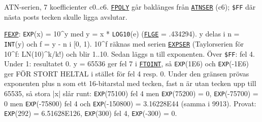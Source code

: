 \begin{Listing}
\Gap
\begin{Cmt}\par\noindent ATN-serien, 7 koefficienter c0..c6. \hyperlink{l:FPOLY}{\texttt{FPOLY}} går baklänges från \hyperlink{l:ATNSER}{\texttt{ATNSER}} (c6); \texttt{\$FF} där nästa posts tecken skulle ligga avslutar.\par\end{Cmt}
\Gap
\begin{Cmt}\par\noindent \hyperlink{l:FEXP}{\texttt{FEXP}}: \texttt{EXP}(x) = 10\^{}y med y = x * \texttt{LOG10}(e) (\hyperlink{l:FLGE}{\texttt{FLGE}} = .434294). y delas i n = \texttt{INT}(y) och f = y - n i [0, 1). 10\^{}f räknas med serien \hyperlink{l:EXPSER}{\texttt{EXPSER}} (Taylorserien för 10\^{}f: LN(10)\^{}k/k!) och blir 1..10. Sedan läggs n till exponenten. Över \texttt{\$FF}: fel 4. Under 1: resultatet 0. {}y{} {}= 65536 ger fel 7 i \hyperlink{l:FTOINT}{\texttt{FTOINT}}, så \texttt{EXP}(1E6) och \texttt{EXP}(\mbox{-}1E6) ger FÖR STORT HELTAL i stället för fel 4 resp. 0. Under den gränsen prövas exponenten plus n som ett 16-bitarstal med tecken, fast n är utan tecken upp till 65535, så stora |x| slår runt: \texttt{EXP}(75100) fel 4 men \texttt{EXP}(75200) = 0, \texttt{EXP}(\mbox{-}75700) = 0 men \texttt{EXP}(\mbox{-}75800) fel 4 och \texttt{EXP}(\mbox{-}150800) = 3.16228E44 (samma i 9913). Provat: \texttt{EXP}(292) = 6.51628E126, \texttt{EXP}(300) fel 4, \texttt{EXP}(\mbox{-}300) = 0.\par\end{Cmt}

\end{Listing}
